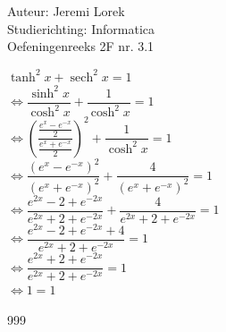 \documentclass[a4paper]{article}
\begin{document}
\newcommand{\sech}{\operatorname{sech}}

\noindent \large Auteur: Jeremi Lorek\\
\noindent \large Studierichting: Informatica\\
\noindent \large Oefeningenreeks 2F nr. 3.1\\

\medskip
\normalsize

$\tanh^2 x + \sech^2 x = 1$  \\

$\Leftrightarrow \dfrac{\sinh^2 x}{\cosh^2 x} + \dfrac{1}{\cosh^2 x} = 1$  \\

$\Leftrightarrow \left( \dfrac{\frac{e^x - e^{-x}}{2}}{\frac{e^x + e^{-x}}{2}} \right)^2 + \dfrac{1}{\cosh^2 x} = 1$  \\

$\Leftrightarrow \dfrac{(e^x - e^{-x})^2}{(e^x + e^{-x})^2} + \dfrac{4}{(e^x + e^{-x})^2} = 1$  \\

$\Leftrightarrow \dfrac{e^{2x} - 2 + e^{-2x}}{e^{2x} + 2 + e^{-2x}} + \dfrac{4}{e^{2x} + 2 + e^{-2x}} = 1$  \\

$\Leftrightarrow \dfrac{e^{2x} - 2 + e^{-2x} + 4}{e^{2x} + 2 + e^{-2x}} = 1$  \\

$\Leftrightarrow \dfrac{e^{2x} + 2 + e^{-2x}}{e^{2x} + 2 + e^{-2x}} = 1$  \\

$\Leftrightarrow 1 = 1$  \\


\begin{thebibliography}{999}
\end{thebibliography}
\end{document}
